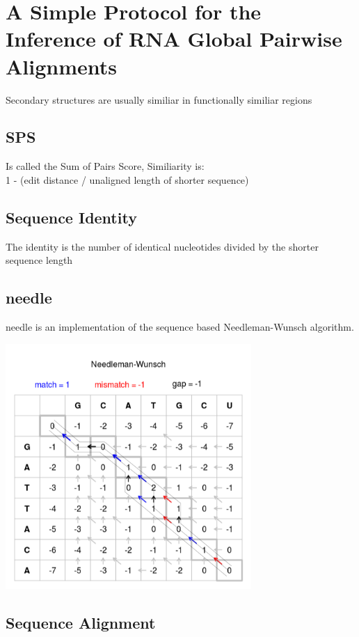 \documentclass{scrartcl}
\begin{document}
\section*{A Simple Protocol for the Inference of RNA Global Pairwise Alignments}






Secondary structures are usually similiar in functionally similiar regions


\subsection*{SPS}
Is called the Sum of Pairs Score, Similiarity is: \\
1 - (edit distance / unaligned length of shorter sequence)

\subsection*{Sequence Identity}
The identity is the number of identical nucleotides divided by the shorter sequence length


\subsection*{needle}

needle is an implementation of the sequence based Needleman-Wunsch algorithm.

\includegraphics[width=0.7\textwidth]{proseminar/images/Needleman-Wunsch_pairwise_sequence_alignment}

\newpage


\subsection*{Sequence Alignment}
\end{document}
